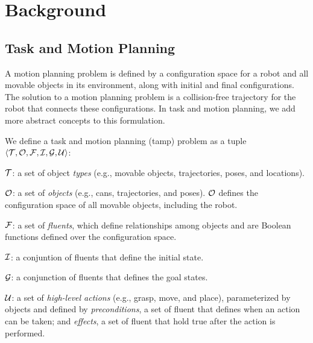 \section{Background}
\subsection{Task and Motion Planning}

A motion planning problem is defined by a configuration space for a
robot and all movable objects in its environment, along with initial
and final configurations. The solution to a motion planning problem is
a collision-free trajectory for the robot that connects these
configurations.  In task and motion planning, we add more abstract
concepts to this formulation.


\begin{defn}
We define a task and motion planning ({\sc tamp}) problem as a tuple
$\langle \mathcal{T}, \mathcal{O}, \mathcal{F}, \mathcal{I}, \mathcal{G}, \mathcal{U} \rangle$:
\begin{tightlist}
\item $\mathcal{T}$: a set of object \emph{types} (e.g., movable objects,
  trajectories, poses, and locations).

\item $\mathcal{O}$: a set of \emph{objects} (e.g., cans, trajectories, and
  poses). $\mathcal{O}$ defines the configuration space of all movable
  objects, including the robot.

\item $\mathcal{F}$: a set of \emph{fluents}, which define relationships among
  objects and are Boolean functions defined over the configuration
  space.

\item $\mathcal{I}$: a conjuntion of fluents that define the initial state.

\item $\mathcal{G}$: a conjunction of fluents that defines the goal states.

\item $\mathcal{U}$: a set of \emph{high-level actions} (e.g., grasp, move, and
  place), parameterized by objects and defined by
  \emph{preconditions}, a set of fluent that defines when an action
  can be taken; and \emph{effects}, a set of fluent that hold true
  after the action is performed.
\end{tightlist}
\end{defn}

